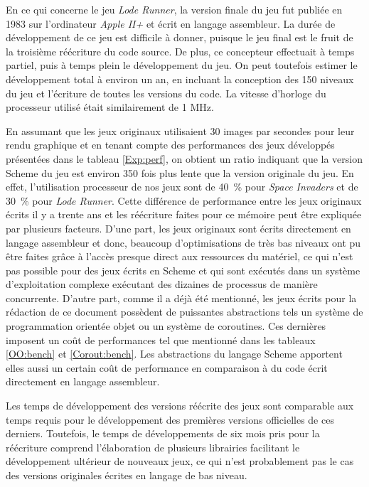 \documentclass[12pt,twoside,letterpaper,francais]{book}
\begin{document}
En ce qui concerne le jeu \textit{Lode Runner}, la version finale du
jeu fut publiée en 1983 sur l'ordinateur \textit{Apple II+} et écrit
en langage assembleur. La durée de développement de ce jeu est
difficile à donner, puisque le jeu final est le fruit de la troisième
réécriture du code source. De plus, ce concepteur effectuait à temps
partiel, puis à temps plein le développement du jeu. On peut toutefois
estimer le développement total à environ un an, en incluant la
conception des 150 niveaux du jeu et l'écriture de toutes les versions
du code. La vitesse d'horloge du processeur utilisé était
similairement de 1 MHz.

En assumant que les jeux originaux utilisaient 30 images par secondes
pour leur rendu graphique et en tenant compte des performances des
jeux développés présentées dans le tableau \ref{Exp:perf}, on obtient
un ratio indiquant que la version Scheme du jeu est environ 350 fois
plus lente que la version originale du jeu. En effet, l'utilisation
processeur de nos jeux sont de 40~\% pour \textit{Space Invaders} et
de 30~\% pour \textit{Lode Runner}. Cette différence de performance
entre les jeux originaux écrits il y a trente ans et les réécriture
faites pour ce mémoire peut être expliquée par plusieurs
facteurs. D'une part, les jeux originaux sont écrits directement en
langage assembleur et donc, beaucoup d'optimisations de très bas
niveaux ont pu être faites grâce à l'accès presque direct aux
ressources du matériel, ce qui n'est pas possible pour des jeux écrits
en Scheme et qui sont exécutés dans un système d'exploitation complexe
exécutant des dizaines de processus de manière concurrente. D'autre
part, comme il a déjà été mentionné, les jeux écrits pour la rédaction
de ce document possèdent de puissantes abstractions tels un système de
programmation orientée objet ou un système de coroutines. Ces
dernières imposent un coût de performances tel que mentionné dans les
tableaux \ref{OO:bench} et \ref{Corout:bench}.  Les abstractions du
langage Scheme apportent elles aussi un certain coût de performance en
comparaison à du code écrit directement en langage assembleur.

Les temps de développement des versions réécrite des jeux sont
comparable aux temps requis pour le développement des premières
versions officielles de ces derniers. Toutefois, le temps de
développements de six mois pris pour la réécriture comprend
l'élaboration de plusieurs librairies facilitant le développement
ultérieur de nouveaux jeux, ce qui n'est probablement pas le cas des
versions originales écrites en langage de bas niveau.
\end{document}
